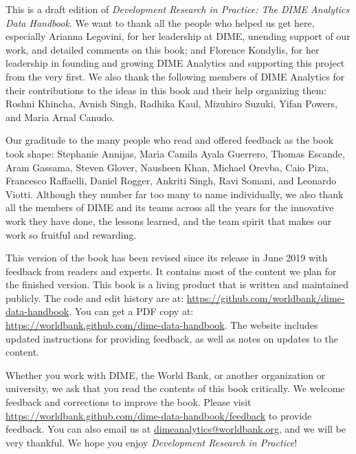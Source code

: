 This is a draft edition of
\textit{Development Research in Practice:
The DIME Analytics Data Handbook}.
We want to thank all the people who helped us get here, especially
Arianna Legovini, for her leadership at DIME, unending support of our work, 
and detailed comments on this book; and 
Florence Kondylis, for her leadership in founding and growing DIME Analytics
and supporting this project from the very first.
We also thank the following members 
of DIME Analytics for their contributions 
to the ideas in this book and their help organizing them: 
Roshni Khincha, Avnish Singh, Radhika Kaul,
Mizuhiro Suzuki, Yifan Powers, and Maria Arnal Canudo.

Our graditude to the many people who read and offered feedback as the book took shape:
Stephanie Annijas,
Maria Camila Ayala Guerrero,
Thomas Escande,
Aram Gassama,
Steven Glover,
Nausheen Khan,
Michael Orevba,
Caio Piza,
Francesco Raffaelli,
Daniel Rogger,
Ankriti Singh,
Ravi Somani,
and Leonardo Viotti.
Although they number far too many to name individually, 
we also thank all the members of DIME and its teams across all the years
for the innovative work they have done, the lessons learned,
and the team spirit that makes our work so fruitful and rewarding.

This version of the book has been revised since its release in June 2019
with feedback from readers and experts.
It contains most of the content we plan for the finished version.
This book is a living product that is written and maintained publicly.
The code and edit history are at:
\url{https://github.com/worldbank/dime-data-handbook}.
You can get a PDF copy at:
\url{https://worldbank.github.com/dime-data-handbook}.
The website includes updated instructions
for providing feedback, as well as notes on updates to the content.

Whether you work with DIME, the World Bank,
or another organization or university,
we ask that you read the contents of this book critically.
We welcome feedback and corrections to improve the book. 
Please visit
\url{https://worldbank.github.com/dime-data-handbook/feedback} 
to provide feedback.
You can also email us at \url{dimeanalytics@worldbank.org}, 
and we will be very thankful.
We hope you enjoy \textit{Development Research in Practice}!

